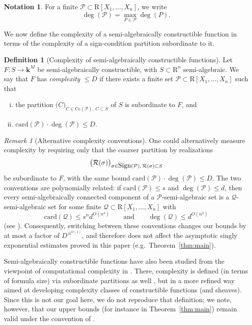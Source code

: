 \documentclass{amsart}[10pts]
\theoremstyle{definition}
\newtheorem{definition}{Definition}[section]
\newtheorem{notation}{Notation}[section]
\theoremstyle{remark}
\newtheorem{remark}{Remark}
\theoremstyle{observation}
\numberwithin{equation}{section}
\newcommand {\R} {\mathrm{R}}
\newcommand {\kk}         {\mathbf{k}}
\newcommand {\RR} {{\mathcal R}}
\newcommand {\Sign}      {\mbox{\rm Sign}}
\newcommand{\card}{\mathrm{card}}
\newcommand{\Cc}{\mathrm{Cc}}
\begin{document}
\begin{notation}
For a finite $\mathcal P\subset \R[X_1,\ldots,X_n]$, we write
\[
\deg(\mathcal P)=\max_{P\in \mathcal P}\deg(P).
\]
\end{notation}

\medskip
We now define the complexity of a semi-algebraically constructible function in terms of the complexity of a sign-condition partition subordinate to it.

\begin{definition}[Complexity of semi-algebraically constructible functions]
\label{def:constructible-function-complexity}
Let $F:S\to \kk^M$ be semi-algebraically constructible, with $S\subset \R^n$ semi-algebraic.
We say that $F$ has \emph{complexity $\le D$} if there exists a finite set $\mathcal P\subset \R[X_1,\ldots,X_n]$ such that
\begin{enumerate}[(i)]
\item the partition $\bigl(C\bigr)_{C\in \Cc(\mathcal P),\, C\subset S}$ of $S$ is subordinate to $F$, and
\item $\card(\mathcal P)\cdot \deg(\mathcal P)\le D$.
\end{enumerate}
\end{definition}

\begin{remark}[Alternative complexity conventions]
\label{rem:alt-complexity}
One could alternatively measure complexity by requiring only that the coarser partition by realizations
\[
\bigl(\RR(\sigma)\bigr)_{\sigma\in \Sign(\mathcal P),\, \RR(\sigma)\subset S}
\]
be subordinate to $F$, with the same bound $\card(\mathcal P)\cdot \deg(\mathcal P)\le D$.
The two conventions are polynomially related: if $\card(\mathcal P)\le s$ and $\deg(\mathcal P)\le d$, then every semi-algebraically connected component of a $\mathcal P$-semi-algebraic set is a $\mathcal Q$-semi-algebraic set for some finite $\mathcal Q\subset \R[X_1,\ldots,X_n]$ with
\[
\card(\mathcal Q)\le s^{n} d^{O(n^4)}
\qquad\text{and}\qquad
\deg(\mathcal Q)\le d^{O(n^3)}
\]
(see \cite[Theorem~16.11]{BPRbook2}).
Consequently, switching between these conventions changes our bounds by at most a factor of $D^{\,n^{O(1)}}$, and therefore does not affect the asymptotic singly exponential estimates proved in this paper (e.g.\ Theorem~\ref{thm:main}).

\medskip
Semi-algebraically constructible functions have also been studied from the viewpoint of computational complexity in \cite{Basu2015}. There, complexity is defined (in terms of formula size) via subordinate partitions as well \cite[Definition~2.16]{Basu2015}, but in a more refined way aimed at developing complexity classes of constructible functions (and sheaves). Since this is not our goal here, we do not reproduce that definition; we note, however, that our upper bounds (for instance in Theorem~\ref{thm:main}) remain valid under the convention of \cite{Basu2015}.
\end{remark}
\end{document}
